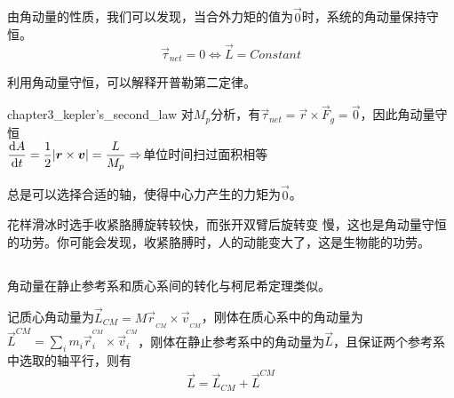 \subsection[角动量守恒]{}
\begin{Itemize}
	\item {}由角动量的性质，我们可以发现，当合外力矩的值为$\vec{0}$时，系统的角动量保持守恒。
	\[\vec{\tau}_{net}=0\Leftrightarrow\vec{L}=Constant\]
\end{Itemize}

利用角动量守恒，可以解释开普勒第二定律。
\begin{singlefigure}{chapter3_kepler's_second_law}
	对$M_p$分析，有$\vec{\tau}_{net}=\vec{r}\times\vec{F}_g=\vec{0}$，因此角动量守恒\\[1ex]
	$\dfrac{\dif A}{\dif t}=\dfrac{1}{2}|\vec{r}\times\vec{v}|=\dfrac{L}{M_p}\Rightarrow$单位时间扫过面积相等
\end{singlefigure}
	
	总是可以选择合适的轴，使得中心力产生的力矩为$\vec{0}$。
	
	花样滑冰时选手收紧胳膊旋转较快，而张开双臂后旋转变
	慢，这也是角动量守恒的功劳。你可能会发现，收紧胳膊时，人的动能变大了，这是生物能的功劳。
\subsection[质心系转化]{}
角动量在静止参考系和质心系间的转化与柯尼希定理类似。
\begin{law}
	记质心角动量为$\vec{L}_{CM}=M\vec{r}_{_{CM}}\times\vec{v}_{_{CM}}$，刚体在质心系中的角动量为$\vec{L}^{CM}=\sum_im_i\vec{r}_i^{^{CM}}\times\vec{v}^{^{CM}}_i$，刚体在静止参考系中的角动量为$\vec{L}$，且保证两个参考系中选取的轴平行，则有
	\[\vec{L}=\vec{L}_{CM}+\vec{L}^{CM}\]
\end{law}
